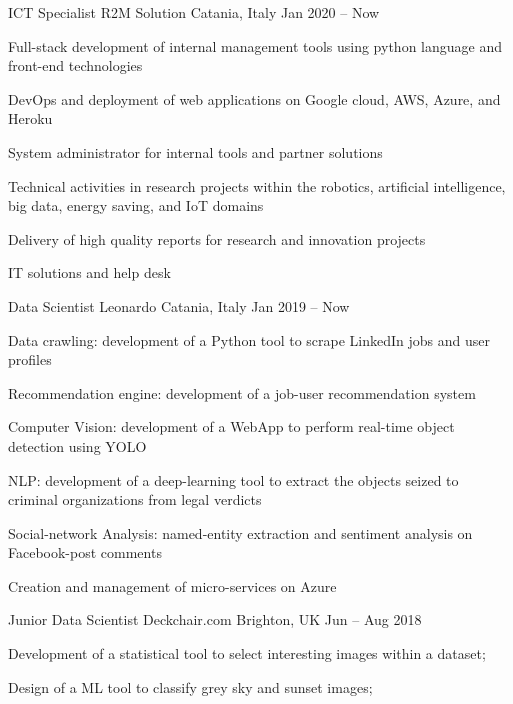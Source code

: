 
  \begin{cventries}
    \cventry
    {ICT Specialist}
    {R2M Solution}    
    {Catania, Italy}
    {Jan 2020 -- Now}
    {
      \begin{cvitems}
        \item {Full-stack development of internal management tools using python language and front-end technologies}
        \item {DevOps and deployment of web applications on Google cloud, AWS, Azure, and Heroku}
        \item {System administrator for internal tools and partner solutions}
        \item {Technical activities in research projects within the robotics, artificial intelligence, big data, energy saving, and IoT domains}
        \item {Delivery of high quality reports for research and innovation projects}
        \item {IT solutions and help desk}
      \end{cvitems}
    }

    \cventry
    {Data Scientist}
    {Leonardo}    
    {Catania, Italy}
    {Jan 2019 -- Now}
    {
      \begin{cvitems}
        \item {Data crawling: development of a Python tool to scrape LinkedIn jobs and user profiles}
        \item {Recommendation engine: development of a job-user recommendation system}
        \item {Computer Vision: development of a WebApp to perform real-time object detection using YOLO}
        \item {NLP: development of a deep-learning tool to extract the objects seized to criminal organizations from legal verdicts}
        \item {Social-network Analysis: named-entity extraction and sentiment analysis on Facebook-post comments}
        \item {Creation and management of micro-services on Azure}
      \end{cvitems}
    }

    \cventry
    {Junior Data Scientist}
    {Deckchair.com}
    {Brighton, UK}
    {Jun -- Aug 2018}
    {
      \begin{cvitems}
        \item Development of a statistical tool to select interesting images within a dataset;
        \item Design of a ML tool to classify grey sky and sunset images;
      \end{cvitems}
    }
  \end{cventries}

